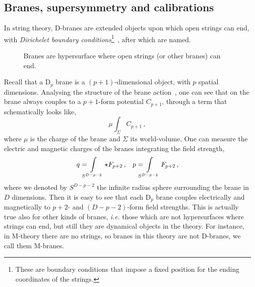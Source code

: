 \documentclass[draft]{phd}
\begin{document}
	\subsection*{Branes, supersymmetry and calibrations}
			In string theory, D-branes are extended objects upon which open strings can end, with \emph{Dirichelet boundary conditions}\footnote{%
				These are boundary conditions that impose a fixed position for the ending coordinates of the strings.%
			}~\cite{polchinski}, after which are named.
					\begin{figure}[h!]
						\centering
						
						\caption{Branes are hypersurface where open strings (or other branes) can end.}
						\label{branefig}
					\end{figure}
			Recall that a $\mathrm{D}_p$ brane is a $(p+1)$-dimensional object, with $p$ spatial dimensions.
			Analysing the structure of the brane action~\cite{PolchinskiBranes}, one can see that on the brane always couples to a $p+1$-form potential $C_{p+1}$, through a term that schematically looks like,
					\begin{equation*}
						\mu \int_{\Sigma} C_{p+1}\, ,
					\end{equation*}
			where $\mu$ is the charge of the brane and $\Sigma$ its world-volume.
			One can measure the electric and magnetic charges of the branes integrating the field strength,
					\begin{align*}
						& & q = \!\!\!\!\! \int\displaylimits_{S^{D-p-2}} \star F_{p+2} \, , & &  p  = \!\!\!\!\! \int\displaylimits_{S^{D-p-2}} F_{p+2} \, , & &
					\end{align*}
			where we denoted by $S^{D-p-2}$ the infinite radius sphere surrounding the brane in $D$ dimensions.
			Then it is easy to see that each $\mathrm{D}_p$ brane couples electrically and magnetically to $p+2$- and $(D-p-2)$-form field strengths.
			This is actually true also for other kinds of branes, \emph{i.e.} those which are not hypersurfaces where strings can end, but still they are dynamical objects in the theory.
			For instance, in M-theory there are no strings, so branes in this theory are not D-branes, we call them M-branes.
			
\end{document}
